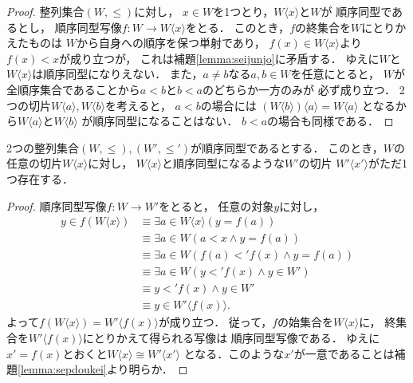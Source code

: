   \begin{proof}
    整列集合$(W, {\leq})$に対し，
    $x \in W$を1つとり，$W \langle x \rangle$と$W$が
    順序同型であるとし，
    順序同型写像$f:W \longrightarrow W \langle x \rangle$をとる．
    このとき，$f$の終集合を$W$にとりかえたものは
    $W$から自身への順序を保つ単射であり，
    $f(x) \in W \langle x \rangle$より$f(x) < x$が成り立つが，
    これは補題\ref{lemma:seijunjo}に矛盾する．
    ゆえに$W$と$W \langle x \rangle$は順序同型になりえない．
    また，$a \neq b$なる$a,b \in W$を任意にとると，
    $W$が全順序集合であることから$a<b$と$b<a$のどちらか一方のみが
    必ず成り立つ．
    2つの切片$W \langle a \rangle, W \langle b \rangle$を考えると，
    $a<b$の場合には
    $(W \langle b \rangle )  \langle a \rangle = W \langle a \rangle$
    となるから$W \langle a \rangle $と$W \langle b \rangle$
    が順序同型になることはない．
    $b<a$の場合も同様である．
  \end{proof}

  \begin{lemma} \label{lemma:sepdoutii}
    2つの整列集合$(W, {\leq}) , (W' , {\leq'})$が順序同型であるとする．
    このとき，$W$の任意の切片$W \langle x \rangle$に対し，
    $W \langle x \rangle$と順序同型になるような$W'$の切片
    $W' \langle x'\rangle$がただ1つ存在する．
  \end{lemma}


  \begin{proof}
    順序同型写像$f: W \longrightarrow W'$をとると，
    任意の対象$y$に対し，
    \begin{align*}
      y \in f ( W \langle x \rangle) 
      & \equiv \exists a \in W \langle x \rangle (y = f(a)) \\
      & \equiv \exists a \in W ( a<x \land y=f(a) ) \\
      & \equiv \exists a \in W ( f(a) <' f(x) \land y = f(a) ) \\
      & \equiv \exists a \in W ( y <' f(x) \land y \in W' ) \\
      & \equiv y <' f(x) \land y \in W' \\
      & \equiv y \in W' \langle f(x) \rangle .
    \end{align*}
    よって$f( W \langle x \rangle ) = 
    W' \langle f(x) \rangle$が成り立つ．
    従って，$f$の始集合を$W \langle x \rangle$に，
    終集合を$W' \langle f(x) \rangle$にとりかえて得られる写像は
    順序同型写像である．
    ゆえに$x' = f(x)$とおくと$W \langle x \rangle \cong W' \langle x' \rangle$
    となる．このような$x'$が一意であることは補題\ref{lemma:sepdoukei}より明らか．
  \end{proof}

